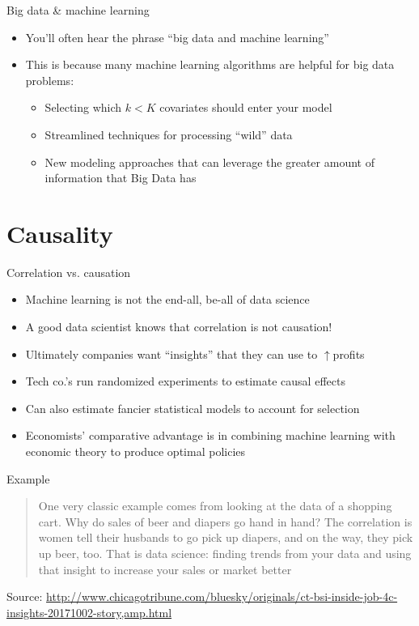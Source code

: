 \documentclass[english,aspectratio=169,12pt,xcolor=dvipsnames]{beamer}
\begin{document}
\begin{frame}{Big data \& machine learning}
\begin{itemize}
\item You'll often hear the phrase ``big data and machine learning''
\item This is because many machine learning algorithms are helpful for big data problems:
    \begin{itemize}
    \item Selecting which $k<K$ covariates should enter your model
    \item Streamlined techniques for processing ``wild'' data
    \item New modeling approaches that can leverage the greater amount of information that Big Data has
    \end{itemize}
\end{itemize}
\end{frame}

\section{Causality}
\begin{frame}{Correlation vs. causation}
\begin{itemize}
\item Machine learning is not the end-all, be-all of data science
\item A good data scientist knows that correlation is not causation!
\item Ultimately companies want ``insights'' that they can use to $\uparrow$profits
\item Tech co.'s run randomized experiments to estimate causal effects
\item Can also estimate fancier statistical models to account for selection
\item Economists' comparative advantage is in combining machine learning with economic theory to produce optimal policies
\end{itemize}
\end{frame}

\begin{frame}{Example}
\begin{quote}
One very classic example comes from looking at the data of a shopping cart. Why do sales of beer and diapers go hand in hand? The correlation is women tell their husbands to go pick up diapers, and on the way, they pick up beer, too. That is data science: finding trends from your data and using that insight to increase your sales or market better
\end{quote}
Source: \url{http://www.chicagotribune.com/bluesky/originals/ct-bsi-inside-job-4c-insights-20171002-story,amp.html}
\end{frame}
\end{document}
